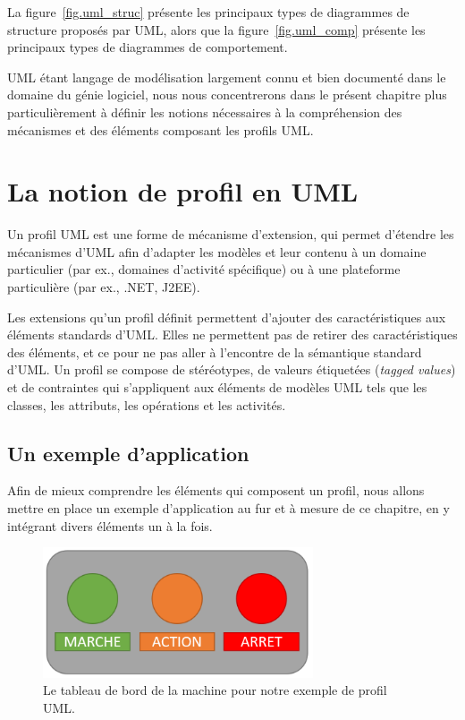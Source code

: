 
La figure~\ref{fig.uml_struc} présente les principaux types de diagrammes de structure proposés par UML,
alors que la figure~\ref{fig.uml_comp} présente les principaux types de diagrammes de comportement.

UML \'etant langage de modélisation largement connu et bien documenté dans le domaine du g\'enie logiciel,
nous nous concentrerons dans le pr\'esent chapitre plus particulièrement à définir les notions nécessaires à la compréhension des mécanismes et des éléments composant les profils UML.



\section{La notion de profil en UML}



Un profil UML est une forme de m\'ecanisme d'extension, qui
permet d'étendre les mécanismes d'UML afin d'adapter les mod\`eles et leur contenu à un domaine particulier (par ex.,  domaines d'activité spécifique) ou \`a une plateforme particulière (par ex.,  .NET, J2EE).

Les extensions qu'un profil d\'efinit permettent d'ajouter des caractéristiques aux éléments standards d'UML.
Elles ne permettent pas de retirer des caractéristiques des éléments, et ce pour ne pas aller à l'encontre de la sémantique standard d'UML.
Un profil se compose  de stéréotypes, de valeurs \'etiquet\'ees (\emph{tagged values}) et de contraintes qui s'appliquent aux éléments de modèles UML tels que les classes, les attributs, les opérations et les activités.

\subsection{Un exemple d'application}
Afin de mieux comprendre les éléments qui composent un profil, nous allons mettre en place un exemple d'application au fur et à mesure de ce chapitre, en y intégrant divers éléments un \`a la fois.

\begin{figure}
    \centering
    \includegraphics[width=8cm]{10_img/chap4/example.PNG}
    \caption{Le tableau de bord de la machine pour notre exemple de profil UML.}
    \label{fig.uml_ex}
\end{figure}

